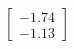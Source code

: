 \documentclass[preview]{standalone}
\begin{document}
\begin{align*}
\begin{bmatrix} -1.74 \\ -1.13 \end{bmatrix}
\end{align*}
\end{document}
